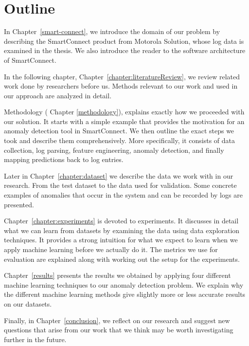 \section{Outline}
In Chapter~\ref{smart-connect}, we introduce the domain of our problem by describing the SmartConnect product from Motorola Solution, whose log data is examined in the thesis. We also introduce the reader to the software architecture of SmartConnect. 

In the following chapter, Chapter~\ref{chapter:literatureReview}, we review related work done by researchers before us. Methods relevant to our work and used in our approach are analyzed in detail.

Methodology ( Chapter \ref{methodology}), explains exactly how we proceeded with our solution. It starts with a simple example that provides the motivation for an anomaly detection tool in SmartConnect. We then outline the exact steps we took and describe them comprehensively. More specifically, it consists of data collection, log parsing, feature engineering, anomaly detection, and finally mapping predictions back to log entries.

Later in Chapter~\ref{chapter:dataset} we describe the data we work with in our research. From the test dataset to the data used for validation. Some concrete examples of anomalies that occur in the system and can be recorded by logs are presented.

Chapter~\ref{chapter:experiments} is devoted to experiments. It discusses in detail what we can learn from datasets by examining the data using data exploration techniques.
It provides a strong intuition for what we expect to learn when we apply machine learning before we actually do it. 
The metrics we use for evaluation are explained along with working out the setup for the experiments.

Chapter~\ref{results} presents the results we obtained by applying four different machine learning techniques to our anomaly detection problem. We explain why the different machine learning methods give slightly more or less accurate results on our datasets.

Finally, in Chapter~\ref{conclusion}, we reflect on our research and suggest new questions that arise from our work that we think may be worth investigating further in the future.